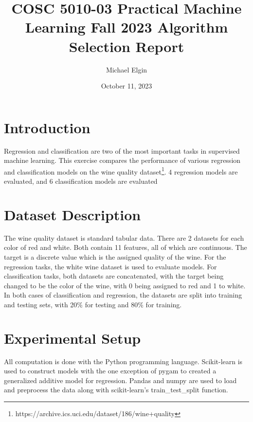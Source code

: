 \documentclass[12pt, letterpaper]{article}
\title{COSC 5010-03 Practical Machine Learning Fall 2023 Algorithm Selection Report}
\author{Michael Elgin}
\date{October 11, 2023}
\begin{document}
\maketitle

\section{Introduction} %

Regression and classification are two of the most important tasks in supervised machine learning. This exercise compares the performance of various regression and classification models on the wine quality dataset\footnote{https://archive.ics.uci.edu/dataset/186/wine+quality}. 4 regression models are evaluated, and 6 classification models are evaluated

\section{Dataset Description} %

The wine quality dataset is standard tabular data. There are 2 datasets for each color of red and white. Both contain 11 features, all of which are continuous. The target is a discrete value which is the assigned quality of the wine. For the regression tasks, the white wine dataset is used to evaluate models. For classification tasks, both datasets are concatenated, with the target being changed to be the color of the wine, with 0 being assigned to red and 1 to white. In both cases of classification and regression, the datasets are split into training and testing sets, with 20\% for testing and 80\% for training.

\section{Experimental Setup} %

All computation is done with the Python programming language. Scikit-learn is used to construct models with the one exception of pygam to created a generalized additive model for regression. Pandas and numpy are used to load and preprocess the data along with scikit-learn's train\_test\_split function.
\end{document}
